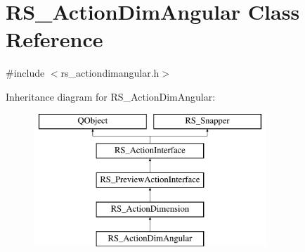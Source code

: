 \hypertarget{classRS__ActionDimAngular}{\section{R\-S\-\_\-\-Action\-Dim\-Angular Class Reference}
\label{classRS__ActionDimAngular}
}


{\ttfamily \#include $<$rs\-\_\-actiondimangular.\-h$>$}

Inheritance diagram for R\-S\-\_\-\-Action\-Dim\-Angular\-:\begin{figure}[H]
\begin{center}
\leavevmode
\includegraphics[height=5.000000cm]{classRS__ActionDimAngular}
\end{center}
\end{figure}
